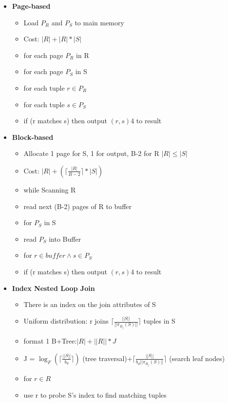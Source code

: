 \documentclass[10pt, landscape]{article}
\newcommand{\ceil}[1]{\lceil #1 \rceil}
\begin{document}
\begin{multicols}{4}
\begin{multicols}{2}
\begin{itemize}
      \item \textbf{Page-based} \newline
      \begin{itemize}
        \item Load $P_R$ and $P_S$ to main memory
        \item Cost: $|R| + |R|*|S|$
        \item for each page $P_R$ in R 
        \item for each page $P_S$ in S
        \item for each tuple $r \in P_R$
        \item for each tuple $s \in P_S$ 
        \item if (r matches s) then output $(r,s)$4 to result
      \end{itemize}


      \item \textbf{Block-based} \newline
      \begin{itemize}
        \item Allocate 1 page for S, 1 for output, B-2 for R $|R| \le |S|$
        \item Cost:  $|R| + (\ceil{\frac{|R|}{B-2}} * |S|)$
        \item while Scanning R
        \item read next (B-2) pages of R to buffer
        \item for $P_S$ in S
        \item read $P_S$ into Buffer
        \item for $r \in buffer \land s \in P_S$
        \item if (r matches s) then output $(r,s)$4 to result
      \end{itemize}

      \item \textbf{Index Nested Loop Join} \newline
      \begin{itemize}
        \item There is an index on the join attributes of S
        \item Uniform distribution: r joins $\ceil{\frac{||S||}{||\pi_{B_j}(S)||}}$ tuples in S
        \item format 1 B+Tree:$|R| + ||R|| * J$
        \item J = $\log_F(\ceil{\frac{||S||}{b_d}})$ (tree traversal)+$\ceil{\frac{||S||}{b_d||\pi_{B_j}(S)||}}$ (search leaf nodes)
        \item for $r \in R$ 
        \item use r to probe S's index to find matching tuples
      \end{itemize}
    \end{itemize}
\end{multicols}



\end{multicols}
\end{document}
